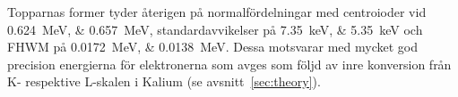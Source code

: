 Topparnas former tyder återigen på normalfördelningar med centroioder vid
\qtylist{0.624;0.657}{\MeV}, standardavvikelser på
\qtylist{7.35;5.35}{\kilo\eV} och FHWM på \qtylist{0.0172;0.0138}{\MeV}.
Dessa motsvarar med mycket god precision energierna för elektronerna som avges
som följd av inre konversion från K- respektive L-skalen i Kalium (se
avsnitt~\ref{sec:theory}).
